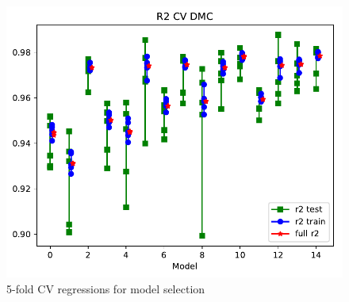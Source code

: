 \documentclass{article}
\begin{document}
\pagebreak
\begin{figure}
\includegraphics[width=1.0\textwidth]{../qwalk/ub3lyp_s1_/analysis/cv_valid.pdf}
\caption{5-fold CV regressions for model selection}
\end{figure}
\end{document}
